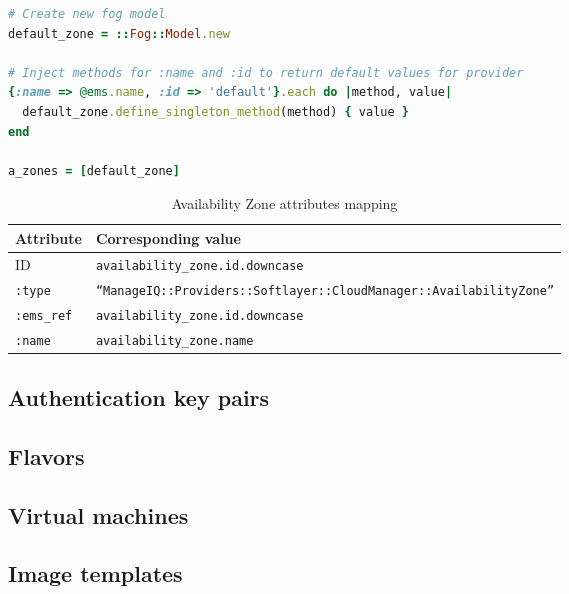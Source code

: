 \begin{lstlisting}[language=Ruby,caption={Declaration of the default \emph{Availability Zone}},label=code:fog_model_zone,float=htpb]
# Create new fog model
default_zone = ::Fog::Model.new

# Inject methods for :name and :id to return default values for provider
{:name => @ems.name, :id => 'default'}.each do |method, value|
  default_zone.define_singleton_method(method) { value }
end

a_zones = [default_zone]
\end{lstlisting}

\begin{table}[ht]
	\centering
	\caption{Availability Zone attributes mapping}\label{tab:Availability Zone attributes mapping}
	\begin{tabular}{ll}
		\toprule
		Attribute          & Corresponding value                                                               \\
		\midrule
		ID                 & \texttt{availability\_zone.id.downcase}                                           \\
		\texttt{:type}     & \small\texttt{``ManageIQ::Providers::Softlayer::CloudManager::AvailabilityZone''} \\
		\texttt{:ems\_ref} & \texttt{availability\_zone.id.downcase}                                           \\
		\texttt{:name}     & \texttt{availability\_zone.name}                                                  \\
		\bottomrule
	\end{tabular}
\end{table}

\subsection{Authentication key pairs}
\label{sub:Authentication key pairs}

\subsection{Flavors}
\label{sub:Flavors}

\subsection{Virtual machines}
\label{sub:Virtual machines}

\subsection{Image templates}
\label{sub:Image templates}

